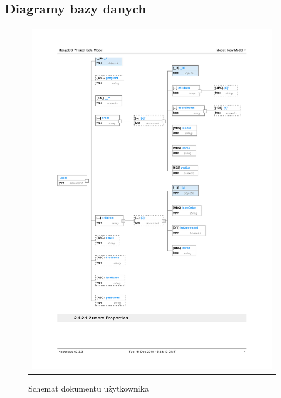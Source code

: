 \documentclass{sprawozdanie-agh}
\begin{document}
		\subsection{Diagramy bazy danych}

			\begin{figure}[H] 
				\centering
				\begin{tabular}{c}
					\includegraphics[width=.95\textwidth]{usersDatabase}
				\end{tabular} 
				\caption{Schemat dokumentu użytkownika}
			\end{figure}
\end{document}
